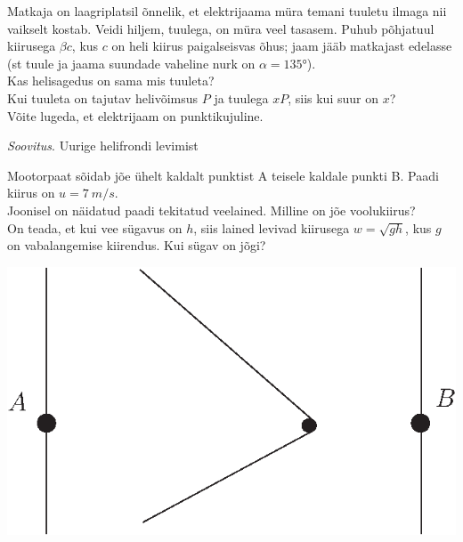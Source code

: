 \documentclass[10pt]{article}
\begin{document}
{%

Matkaja on laagriplatsil õnnelik, et elektrijaama müra temani tuuletu ilmaga nii vaikselt kostab. Veidi hiljem, tuulega, on müra veel tasasem. Puhub põhjatuul kiirusega $\beta c$, kus $c$ on heli kiirus paigalseisvas õhus; jaam jääb matkajast edelasse
(st tuule ja jaama suundade vaheline nurk on $\alpha = \ang{135}$).\\
\osa Kas helisagedus on sama mis tuuleta?\\
\osa Kui tuuleta on tajutav helivõimsus $P$ ja tuulega $xP$, siis kui suur on $x$?\\
Võite lugeda, et elektrijaam on punktikujuline. 

\emph{Soovitus}. Uurige helifrondi levimist
\probend
\bigskip


Mootorpaat sõidab jõe ühelt kaldalt punktist A teisele kaldale punkti B. Paadi kiirus on $u=\SI{7}{m/s}$.\\
\osa Joonisel on näidatud paadi tekitatud veelained. Milline on jõe voolukiirus?\\
\osa On teada, et kui vee sügavus on $h$, siis lained levivad kiirusega $w=\sqrt{gh}$, kus $g$ on vabalangemise kiirendus.
Kui sügav on jõgi?

\begin{center}
\includegraphics[width=0.55\linewidth]{2009-v3g-08-paat.eps}
\end{center}
\probend
\bigskip


}
\end{document}
